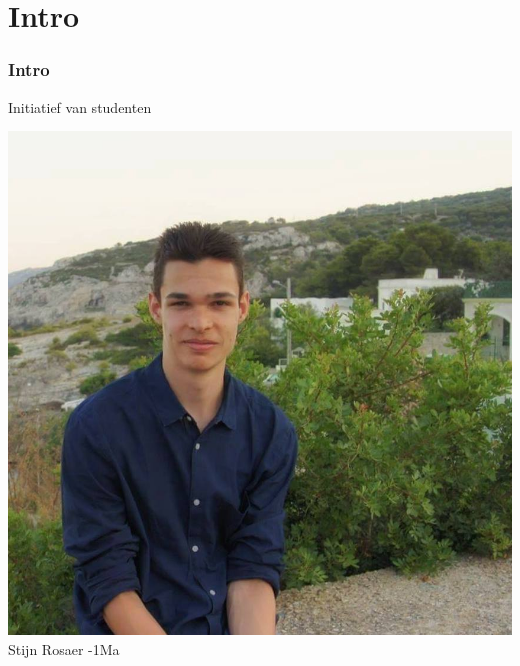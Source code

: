 

\section{Intro}
\addtocounter{minutes}{2}
\begin{frame}%
	\frametitle{Intro}%
    Initiatief van studenten
	\vspace{0.2cm}
	
   	\centering%
   	\begin{minipage}{0.30\linewidth}%
        \centering%
		\includegraphics[width=\linewidth]{res/stijn} \\%
        \footnotesize Stijn Rosaer -1Ma\strut%
    \end{minipage}
    \begin{minipage}{0.30\linewidth}%
        \centering%

\end{minipage}
\end{frame}
